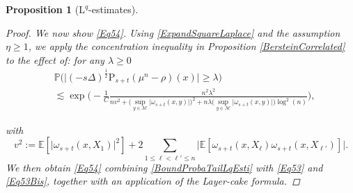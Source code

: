 \documentclass[11pt,a4paper,oneside]{amsart}
\numberwithin{equation}{section}
\newtheorem{proposition}[theorem]{Proposition}
\newcommand{\dd}{\mathrm{d}}
\newcommand{\LL}{\mathrm{L}}
\begin{document}
\begin{proposition}[$\LL^{q}$-estimates]
\begin{proof}
We now show \eqref{Eq54}. Using \eqref{ExpandSquareLaplace} and the assumption $\eta\geq 1$, we apply the concentration inequality in Proposition \ref{BersteinCorrelated} to the effect of: for any $\lambda\geq 0$
%
\begin{equation}\label{BoundProbaTailLqEsti}
%
\begin{aligned}
%
&\mathbb{P}\bigg(\Big\vert(-s\Delta)^{\frac{1}{2}}\text{P}_{s+t}(\mu^n-\rho)(x)\Big\vert\geq \lambda\bigg)\\
&\lesssim \exp\bigg(-\frac{1}{C}\frac{n^2\lambda^2}{nv^2+\big(\sup_{y\in\mathcal{M}}\vert\omega_{s+t}(x,y)\vert\big)^2+n\lambda\big(\sup_{y\in\mathcal{M}}\vert\omega_{s+t}(x,y)\vert\big)\log^2(n)}\bigg),
%
\end{aligned}
%
\end{equation}

%
with 
%
$$v^2:=\mathbb{E}[\vert\omega_{s+t}(x,X_1)\vert^2]+2\sum_{1\leq \ell<\ell'\leq n}\big\vert\mathbb{E}[\omega_{s+t}(x,X_\ell)\omega_{s+t}(x,X_{\ell'})]\big\vert.$$
%
We then obtain \eqref{Eq54} combining \eqref{BoundProbaTailLqEsti} with \eqref{Eq53} and \eqref{Eq53Bis}, together with an application of the Layer-cake formula.
%
%
%
%
%
%
%
%
%
%
%
%
%
%
%
%
%


\end{proof}
\end{proposition}
\end{document}
